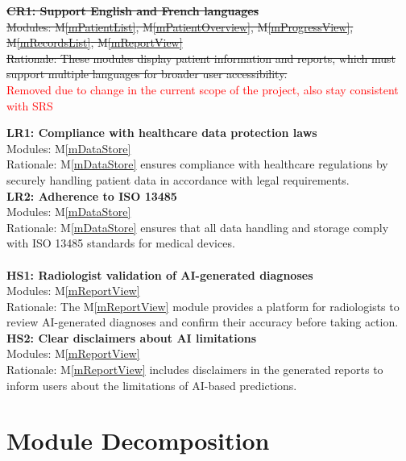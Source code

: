 \documentclass[12pt, titlepage]{article}
\newcommand{\mref}[1]{M\ref{#1}}
\begin{document}
\sout{\textbf{CR1: Support English and French languages}} \\
\sout{Modules: \mref{mPatientList}, \mref{mPatientOverview}, \mref{mProgressView}, \mref{mRecordsList}, \mref{mReportView}} \\
\sout{Rationale: These modules display patient information and reports, which must support multiple languages for broader user accessibility.} \\
\textcolor{red}{Removed due to change in the current scope of the project, also stay consistent with SRS}


\newline
\textbf{LR1: Compliance with healthcare data protection laws} \\
Modules: \mref{mDataStore} \\
Rationale: \mref{mDataStore} ensures compliance with healthcare regulations by securely handling patient data in accordance with legal requirements. \\
\newline
\textbf{LR2: Adherence to ISO 13485} \\
Modules: \mref{mDataStore} \\
Rationale: \mref{mDataStore} ensures that all data handling and storage comply with ISO 13485 standards for medical devices.\\

 \\
\newline
\textbf{HS1: Radiologist validation of AI-generated diagnoses} \\
Modules: \mref{mReportView} \\
Rationale: The \mref{mReportView} module provides a platform for radiologists to review AI-generated diagnoses and confirm their accuracy before taking action. \\
\newline
\textbf{HS2: Clear disclaimers about AI limitations} \\
Modules: \mref{mReportView} \\
Rationale: \mref{mReportView} includes disclaimers in the generated reports to inform users about the limitations of AI-based predictions. \\

\section{Module Decomposition} \label{SecMD}
\end{document}
